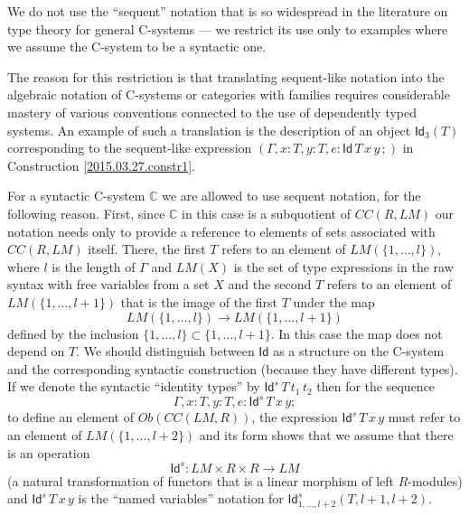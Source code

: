 \documentclass[12pt]{article}
\numberwithin{equation}{section}
\newcommand{\sr}{\rightarrow}
\newcommand{\toCC}{CC} %
\newcommand{\CC}{{\mathbb C}}  %
\newcommand{\p}{\mathsf{p}}
\newcommand{\Id}{\mathsf{Id}} %
\newcommand{\Idx}{\mathsf{Id}_3} %
\begin{document}
We do not use the ``sequent'' notation that is so widespread in the literature
on type theory for general C-systems --- we restrict its use only to examples where
we assume the C-system to be a syntactic one.

The reason for this restriction is that translating sequent-like notation
into the algebraic notation of C-systems or categories with families requires
considerable mastery of various conventions connected to the use of dependently
typed systems. An example of such a translation is the description of an object
$\Idx(T)$ corresponding to the sequent-like expression
$(\Gamma, x:T, y:T, e:\Id\, T\, x\, y\,;)$ in Construction \ref{2015.03.27.constr1}.


For a syntactic C-system $\CC$ we are allowed to use sequent notation, for the
following reason. First, since $\CC$ in this case is a subquotient of
$\toCC(R,LM)$ our notation needs only to provide a reference to elements of sets
associated with $\toCC(R,LM)$ itself.  There, the first $T$ refers to an element
of $LM(\{1,\dots,l\})$, where $l$ is the length of $\Gamma$ and $LM(X)$ is the
set of type expressions in the raw syntax with free variables from a set $X$
and the second $T$ refers to an element of $LM(\{1,\dots,l+1\})$ that is the
image of the first $T$ under the map
%
$$LM(\{1,\dots,l\})\sr LM(\{1,\dots,l+1\})$$
%
defined by the inclusion $\{1,\dots,l\}\subset \{1,\dots,l+1\}$. In this case
the map does not depend on $T$. We should distinguish between $\Id$ as a
structure on the C-system and the corresponding syntactic construction (because
they have different types). If we denote the syntactic ``identity types'' by
$\Id^s\, T\, t_1\, t_2$ then for the sequence
%
$$\Gamma, x:T, y:T, e:\Id^s\,T\,x\,y;$$
%
to define an element of $Ob(\toCC(LM,R))$, the expression $\Id^s\,T\,x\,y$ must
refer to an element of $LM(\{1,\dots,l+2\})$ and its form shows that we assume
that there is an operation
%
$$\Id^s:LM\times R\times R\sr LM$$
%
(a natural transformation of functors that is a linear morphism of left
$R$-modules) and $\Id^s\,T\,x\,y$ is the ``named variables'' notation for
$\Id^s_{{1,\dots,l+2}}(T,l+1,l+2)$.
\end{document}
